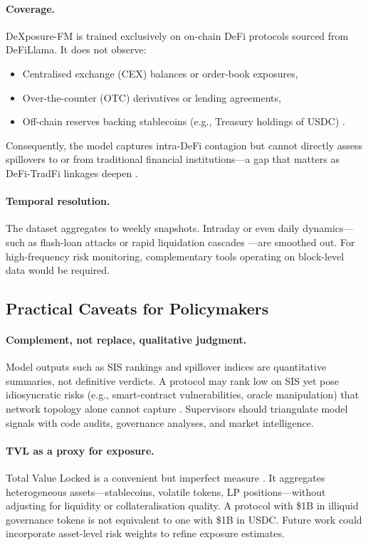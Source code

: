 \paragraph{Coverage.}
DeXposure-FM is trained exclusively on on-chain DeFi protocols sourced from DeFiLlama. It does not observe:
\begin{itemize}
  \item Centralised exchange (CEX) balances or order-book exposures,
  \item Over-the-counter (OTC) derivatives or lending agreements,
  \item Off-chain reserves backing stablecoins (e.g., Treasury holdings of USDC) \citep{AnaduEtAl2023StablecoinsMMF}.
\end{itemize}
Consequently, the model captures intra-DeFi contagion but cannot directly assess spillovers to or from traditional financial institutions---a gap that matters as DeFi-TradFi linkages deepen \citep{ESRB2025}.

\paragraph{Temporal resolution.}
The dataset aggregates to weekly snapshots. Intraday or even daily dynamics---such as flash-loan attacks \citep{Qin2021FlashLoans} or rapid liquidation cascades \citep{Warmuz2023ToxicLiquidationSpirals}---are smoothed out. For high-frequency risk monitoring, complementary tools operating on block-level data would be required.


\subsection{Practical Caveats for Policymakers}
\label{subsec:caveats}

\paragraph{Complement, not replace, qualitative judgment.}
Model outputs such as SIS rankings and spillover indices are quantitative summaries, not definitive verdicts. A protocol may rank low on SIS yet pose idiosyncratic risks (e.g., smart-contract vulnerabilities, oracle manipulation) that network topology alone cannot capture \citep{DuleyEtAl2023Oracle,Gogol2024SoKDeFi}. Supervisors should triangulate model signals with code audits, governance analyses, and market intelligence.

\paragraph{TVL as a proxy for exposure.}
Total Value Locked is a convenient but imperfect measure \citep{Bertomeu2024}. It aggregates heterogeneous assets---stablecoins, volatile tokens, LP positions---without adjusting for liquidity or collateralisation quality. A protocol with \$1B in illiquid governance tokens is not equivalent to one with \$1B in USDC. Future work could incorporate asset-level risk weights to refine exposure estimates.

